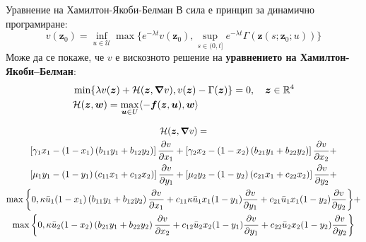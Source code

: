 \begin{frame}[t]{Уравнение на Хамилтон-Якоби-Белман}
  В сила е принцип за динамично програмиране:
  \begin{equation}
    v(\boldsymbol{z}_0) = \inf_{u \in \mathscr{U}} \max\{e^{-\lambda t} v(\boldsymbol{z}_0), \sup_{s \in (0, t]} e^{-\lambda t} \Gamma(\boldsymbol{z}(s; \boldsymbol{z}_0; u))\}
  \end{equation}
  Може да се покаже, че $v$ е вискозното решение на \textbf{уравнението на Хамилтон-Якоби–Белман}:
  \begin{equation}
    \begin{split}
      \label{HJB}
      &\min\{\lambda v(\boldsymbol{z}) + \mathcal{H}(\boldsymbol{z}, \grad{v}), v(\boldsymbol{z}) - \Gamma(\boldsymbol{z}) \} = 0, \quad \boldsymbol{z} \in \mathbb{R}^4 \\
      &\mathcal{H}(\boldsymbol{z}, \boldsymbol{w}) = \max_{\boldsymbol{u} \in U} \langle -\boldsymbol{f}(\boldsymbol{z}, \boldsymbol{u}), \boldsymbol{w} \rangle
    \end{split}
  \end{equation}

  \begin{footnotesize}
    \begin{multline}
      \label{eq:HamiltonianShort}
      \mathcal{H}(\boldsymbol{z}, \grad{v}) = \\
      \left[\gamma_1 x_1 - (1-x_1) \left(b_{11} y_1 + b_{12} y_2\right) \right] \pdv{v}{x_1} +
      \left[\gamma_2 x_2 - (1-x_2) \left(b_{21} y_1 + b_{22} y_2\right) \right] \pdv{v}{x_2} + \\
      \left[\mu_1 y_1 - (1-y_1) \left(c_{11} x_1 + c_{12} x_2\right) \right] \pdv{v}{y_1} +
      \left[\mu_2 y_2 - (1-y_2) \left(c_{21} x_1 + c_{22} x_2\right)\right] \pdv{v}{y_2} + \\
      \max\bigg\{0, \kappa \bar{u}_1 (1-x_1) \left(b_{11} y_1 + b_{12} y_2\right) \pdv{v}{x_1} + c_{11} \kappa \bar{u}_1 x_1 (1-y_1)\pdv{v}{y_1} + c_{21} \bar{u}_1 x_1 (1-y_2) \pdv{v}{y_2}
      \bigg\} + \\
      \max\bigg\{0, \kappa \bar{u}_2 (1-x_2) \left(b_{21} y_1 + b_{22} y_2\right) \pdv{v}{x_2} + c_{12} \bar{u}_2 x_2 (1-y_1)\pdv{v}{y_1} + c_{22}  \bar{u}_2 x_2 (1-y_2)\pdv{v}{y_2} \bigg\}
    \end{multline}
  \end{footnotesize}

\end{frame}

